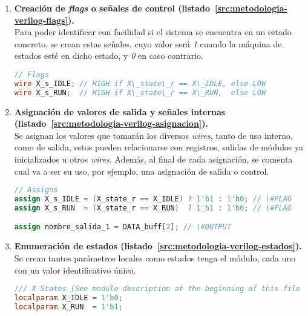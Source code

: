 \begin{enumerate}
    \item{\textbf{Creación de \textit{flags} o señales de control (listado~\ref{src:metodologia-verilog-flags}).}} \\
    Para poder identificar con facilidad si el sistema se encuentra en un estado concreto, se crean estas señales, cuyo valor será \textit{1} cuando la máquina de estados esté en dicho estado, y \textit{0} en caso contrario.
    \begin{lstlisting}[language=Verilog,
        caption={Ejemplo de creación de \textit{flags}.},
        label=src:metodologia-verilog-flags]
// Flags
wire X_s_IDLE; // HIGH if X\_state\_r == X\_IDLE, else LOW
wire X_s_RUN;  // HIGH if X\_state\_r == X\_RUN,  else LOW
    \end{lstlisting}

    \item{\textbf{Asignación de valores de salida y señales internas (listado~\ref{src:metodologia-verilog-asignacion}).}} \\
    Se asignan los valores que tomarán los diversos \emph{wires}, tanto de uso interno, como de salida, estos pueden relacionarse con registros, salidas de módulos ya inicializados u otros \emph{wires}. Además, al final de cada asignación, se comenta cual va a ser su uso, por ejemplo, una asignación de salida o control.
    \begin{lstlisting}[language=Verilog,
        caption={Ejemplo de asignación de valores.},
        label=src:metodologia-verilog-asignacion]
// Assigns
assign X_s_IDLE = (X_state_r == X_IDLE) ? 1'b1 : 1'b0; // \#FLAG
assign X_s_RUN  = (X_state_r == X_RUN)  ? 1'b1 : 1'b0; // \#FLAG

assign nombre_salida_1 = DATA_buff[2]; // \#OUTPUT
    \end{lstlisting}
    

    \item{\textbf{Enumeración de estados (listado~\ref{src:metodologia-verilog-estados}).}} \\
    Se crean tantos parámetros locales como estados tenga el módulo, cada uno con un valor identificativo único.
    \begin{lstlisting}[language=Verilog,
        caption={Ejemplo de enumeración de estados.},
        label=src:metodologia-verilog-estados]
/// X States (See module description at the beginning of this file to get more info)
localparam X_IDLE = 1'b0;
localparam X_RUN  = 1'b1;
    \end{lstlisting}
    


\end{enumerate}
